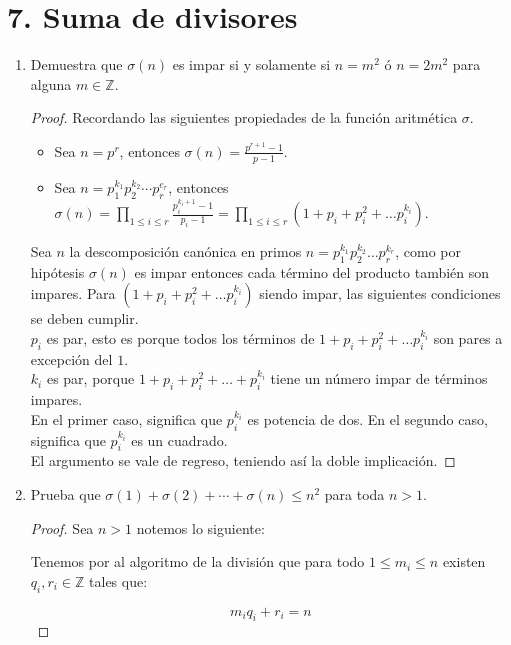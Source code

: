 \documentclass[12pt]{article}
\newcommand{\Z}{\mathbb{Z}}
\begin{document}
\section*{7. Suma de divisores}
\begin{enumerate}
    \item Demuestra que $\sigma(n)$ es impar si y solamente si $n=m^2$ \'o $n=2m^2$ para 
    alguna $m\in\Z$.
    \begin{proof}
    Recordando las siguientes propiedades de la función aritmética $\sigma$.
    \begin{itemize}
        \item Sea $n = p^r$, entonces $\sigma(n) = \frac{p^{r+1}-1}{p -1}.$
        \item Sea $n = p_1^{k_1} p_2^{k_2} \cdots p_r^{e_r}$, entonces
            $\sigma(n) = \prod_{1 \leq i \leq r} \frac{p_i^{k_i +1}-1}{p_i - 1} =
            \prod_{1 \leq i \leq r} (1 + p_i + p_i^2 + \ldots p_i^{k_i})$.
    \end{itemize}
    Sea $n$ la descomposición canónica en primos $n = p_1^{k_1} p_2^{k_2} \ldots p_r^{k_r}$,
    como por hipótesis $\sigma(n)$ es impar entonces cada término del producto también son
    impares. Para $(1 + p_i + p_i^2 + \ldots p_i^{k_i})$ siendo impar, las siguientes 
    condiciones se deben cumplir.\\
    $p_i$ es par, esto es porque todos los términos de 
    $1 + p_i + p_i^2 + \ldots p_i^{k_i}$ son pares a excepción del $1$.\\
    $k_i$ es par, porque $1 + p_i + p_i^2 + \ldots + p_i^{k_i}$ tiene un número impar
    de términos impares.\\
    En el primer caso, significa que $p_i^{k_i}$ es potencia de dos. En el segundo caso,
    significa que $p_i^{k_i}$ es un cuadrado.\\
    El argumento se vale de regreso, teniendo así la doble implicación.
    \end{proof}

    \item Prueba que $\sigma(1)+\sigma(2)+\cdots+\sigma(n)\leq n^2$ para toda $n>1$.
    \begin{proof}
    Sea $n > 1$ notemos lo siguiente:
    
    Tenemos por al algoritmo de la división que para todo $ 1 \leq m_i \leq n$ existen $q_i, r_i \in \mathbb{Z}$ tales que:
    
    \begin{equation}
        m_iq_i + r_i = n
    \end{equation}
    

\end{proof}
\end{enumerate}
\end{document}
